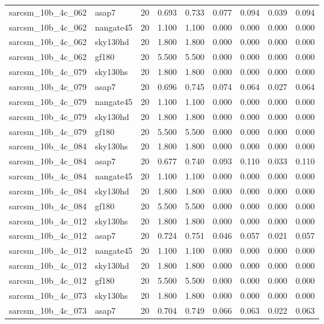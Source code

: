 \begin{tabular}{llrrrrrrr}
sarcsm\_10b\_4c\_062 & asap7 & 20 & 0.693 & 0.733 & 0.077 & 0.094 & 0.039 & 0.094 \\
sarcsm\_10b\_4c\_062 & nangate45 & 20 & 1.100 & 1.100 & 0.000 & 0.000 & 0.000 & 0.000 \\
sarcsm\_10b\_4c\_062 & sky130hd & 20 & 1.800 & 1.800 & 0.000 & 0.000 & 0.000 & 0.000 \\
sarcsm\_10b\_4c\_062 & gf180 & 20 & 5.500 & 5.500 & 0.000 & 0.000 & 0.000 & 0.000 \\
sarcsm\_10b\_4c\_079 & sky130hs & 20 & 1.800 & 1.800 & 0.000 & 0.000 & 0.000 & 0.000 \\
sarcsm\_10b\_4c\_079 & asap7 & 20 & 0.696 & 0.745 & 0.074 & 0.064 & 0.027 & 0.064 \\
sarcsm\_10b\_4c\_079 & nangate45 & 20 & 1.100 & 1.100 & 0.000 & 0.000 & 0.000 & 0.000 \\
sarcsm\_10b\_4c\_079 & sky130hd & 20 & 1.800 & 1.800 & 0.000 & 0.000 & 0.000 & 0.000 \\
sarcsm\_10b\_4c\_079 & gf180 & 20 & 5.500 & 5.500 & 0.000 & 0.000 & 0.000 & 0.000 \\
sarcsm\_10b\_4c\_084 & sky130hs & 20 & 1.800 & 1.800 & 0.000 & 0.000 & 0.000 & 0.000 \\
sarcsm\_10b\_4c\_084 & asap7 & 20 & 0.677 & 0.740 & 0.093 & 0.110 & 0.033 & 0.110 \\
sarcsm\_10b\_4c\_084 & nangate45 & 20 & 1.100 & 1.100 & 0.000 & 0.000 & 0.000 & 0.000 \\
sarcsm\_10b\_4c\_084 & sky130hd & 20 & 1.800 & 1.800 & 0.000 & 0.000 & 0.000 & 0.000 \\
sarcsm\_10b\_4c\_084 & gf180 & 20 & 5.500 & 5.500 & 0.000 & 0.000 & 0.000 & 0.000 \\
sarcsm\_10b\_4c\_012 & sky130hs & 20 & 1.800 & 1.800 & 0.000 & 0.000 & 0.000 & 0.000 \\
sarcsm\_10b\_4c\_012 & asap7 & 20 & 0.724 & 0.751 & 0.046 & 0.057 & 0.021 & 0.057 \\
sarcsm\_10b\_4c\_012 & nangate45 & 20 & 1.100 & 1.100 & 0.000 & 0.000 & 0.000 & 0.000 \\
sarcsm\_10b\_4c\_012 & sky130hd & 20 & 1.800 & 1.800 & 0.000 & 0.000 & 0.000 & 0.000 \\
sarcsm\_10b\_4c\_012 & gf180 & 20 & 5.500 & 5.500 & 0.000 & 0.000 & 0.000 & 0.000 \\
sarcsm\_10b\_4c\_073 & sky130hs & 20 & 1.800 & 1.800 & 0.000 & 0.000 & 0.000 & 0.000 \\
sarcsm\_10b\_4c\_073 & asap7 & 20 & 0.704 & 0.749 & 0.066 & 0.063 & 0.022 & 0.063 \\

\end{tabular}
